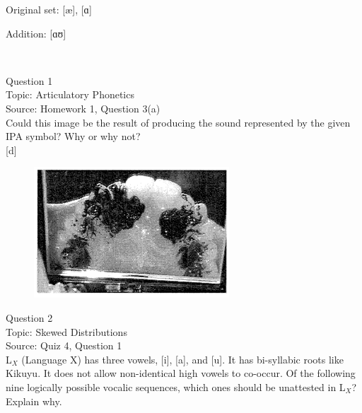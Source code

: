\documentclass[12pt]{article}
\begin{document}
Original set: {[æ]}, {[ɑ]}

Addition: {[ɑʊ]}


\newpage

\begin{center}
\textbf{{\color{red}{\HUGE END OF EXAM}}}\\

\end{center}
\newpage

\begin{center}
\textbf{{\color{blue}{\HUGE START OF EXAM\\}}}

\textbf{{\color{blue}{\HUGE Student ID: 49816\\}}}

\textbf{{\color{blue}{\HUGE 9:10\\}}}

\end{center}
\newpage

{\large Question 1}\\

Topic: Articulatory Phonetics\\
Source: Homework 1, Question 3(a)\\

Could this image be the result of producing the sound represented by the given IPA symbol? Why or why not?\\

{[d]}

\begin{figure}[H]
\includegraphics{../images/staticpalatography_fricative.png}
\end{figure}

\newpage

{\large Question 2}\\

Topic: Skewed Distributions\\
Source: Quiz 4, Question 1\\

L$_X$ (Language X) has three vowels, [i], [a], and [u]. It has bi-syllabic roots like Kikuyu. It does not allow non-identical high vowels to co-occur. Of the following nine logically possible vocalic sequences, which ones should be unattested in L$_X$? Explain why.\\
\end{document}
